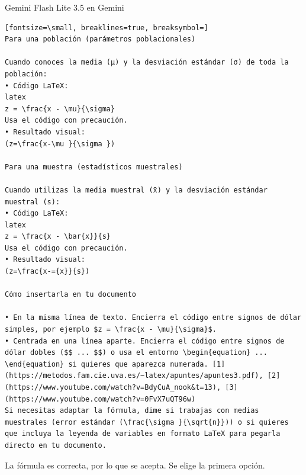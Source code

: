 \documentclass[12pt,a4paper,oneside]{book}
\begin{document}
\begin{iaprompt}
\begin{iaresp}{Gemini Flash Lite 3.5 en Gemini}
\begin{Verbatim}[fontsize=\small, breaklines=true, breaksymbol=]
Para una población (parámetros poblacionales)

Cuando conoces la media (μ) y la desviación estándar (σ) de toda la población:
• Código LaTeX:
latex
z = \frac{x - \mu}{\sigma}
Usa el código con precaución.
• Resultado visual:
(z=\frac{x-\mu }{\sigma })

Para una muestra (estadísticos muestrales)

Cuando utilizas la media muestral (x̄) y la desviación estándar muestral (s):
• Código LaTeX:
latex
z = \frac{x - \bar{x}}{s}
Usa el código con precaución.
• Resultado visual:
(z=\frac{x-={x}}{s})

Cómo insertarla en tu documento

• En la misma línea de texto. Encierra el código entre signos de dólar simples, por ejemplo $z = \frac{x - \mu}{\sigma}$.
• Centrada en una línea aparte. Encierra el código entre signos de dólar dobles ($$ ... $$) o usa el entorno \begin{equation} ... \end{equation} si quieres que aparezca numerada. [1] (https://metodos.fam.cie.uva.es/~latex/apuntes/apuntes3.pdf), [2] (https://www.youtube.com/watch?v=BdyCuA_nook&t=13), [3] (https://www.youtube.com/watch?v=0FvX7uQT96w)
Si necesitas adaptar la fórmula, dime si trabajas con medias muestrales (error estándar (\frac{\sigma }{\sqrt{n}})) o si quieres que incluya la leyenda de variables en formato LaTeX para pegarla directo en tu documento.

\end{Verbatim}
\end{iaresp}
\begin{iaanalisis}
La fórmula es correcta, por lo que se acepta. Se elige la primera opción.
\end{iaanalisis}



\end{iaprompt}
\end{document}
